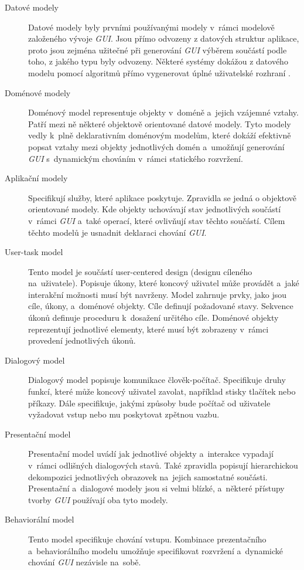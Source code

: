\documentclass[11pt,twoside,a4paper]{book}
\begin{document}
\begin{description}
\item[Datové modely]
Datové modely byly prvními používanými modely v~rámci modelově založeného vývoje \textit{GUI}. Jsou přímo odvozeny z datových struktur aplikace, proto jsou zejména užitečné při generování \textit{GUI} výběrem součástí podle toho, z jakého typu byly odvozeny. Některé systémy dokážou z datového modelu pomocí algoritmů přímo vygenerovat úplné uživatelské rozhraní \cite{bib:model2}.
\item[Doménové modely]
Doménový model representuje objekty v~doméně a~jejich vzájemné vztahy. Patří mezi ně některé objektově orientované datové modely. Tyto modely vedly k~plně deklarativním doménovým modelům, které dokáží efektivně popsat vztahy mezi objekty jednotlivých domén a~umožňují generování \textit{GUI} s~dynamickým chováním v~rámci statického rozvržení\cite{bib:ui}.
\item[Aplikační modely]
Specifikují služby, které aplikace poskytuje. Zpravidla se jedná o objektově orientované modely. Kde objekty uchovávají stav jednotlivých součástí v~rámci \textit{GUI} a~také operací, které ovlivňují stav těchto součástí. Cílem těchto modelů je usnadnit deklaraci chování \textit{GUI}.
\item[User-task model]
Tento model je součástí user-centered design (designu cíleného na~uživatele). Popisuje úkony, které koncový uživatel může provádět a~jaké interakční možnosti musí být navrženy. Model zahrnuje prvky, jako jsou cíle, úkony, a~doménové objekty. Cíle definují požadované stavy. Sekvence úkonů definuje proceduru k~dosažení určitého cíle. Doménové objekty reprezentují jednotlivé elementy, které musí být zobrazeny v~rámci provedení jednotlivých úkonů.
\item[Dialogový model]
Dialogový model popisuje komunikace člověk-počítač. Specifikuje druhy funkcí, které může koncový uživatel zavolat, například stisky tlačítek nebo příkazy. Dále specifikuje, jakými způsoby bude počítač od uživatele vyžadovat vstup nebo mu poskytovat zpětnou vazbu.
\item[Presentační model]
Presentační model uvádí jak jednotlivé objekty a~interakce vypadají v~rámci odlišných dialogových stavů. Také zpravidla popisují hierarchickou dekompozici jednotlivých obrazovek na~jejich samostatné součásti. Presentační a~dialogové modely jsou si velmi blízké, a~některé přístupy tvorby \textit{GUI} používají oba tyto modely.
\item[Behaviorální model]
Tento model specifikuje chování vstupu. Kombinace prezentačního a~behaviorálního modelu umožňuje specifikovat rozvržení a~dynamické chování \textit{GUI} nezávisle na~sobě.
\end{description}
\end{document}
